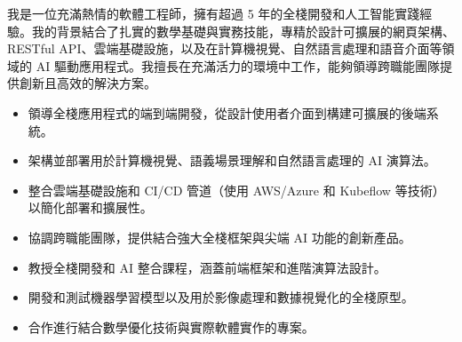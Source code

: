 \documentclass[10pt,a4paper]{altacv}
\begin{document}
\begin{CJK*}{UTF8}{bsmi}


\begin{fullwidth}
\makecvheader
\end{fullwidth}

我是一位充滿熱情的軟體工程師，擁有超過 5 年的全棧開發和人工智能實踐經驗。我的背景結合了扎實的數學基礎與實務技能，專精於設計可擴展的網頁架構、RESTful API、雲端基礎設施，以及在計算機視覺、自然語言處理和語音介面等領域的 AI 驅動應用程式。我擅長在充滿活力的環境中工作，能夠領導跨職能團隊提供創新且高效的解決方案。


\begin{itemize}
\item 領導全棧應用程式的端到端開發，從設計使用者介面到構建可擴展的後端系統。
\item 架構並部署用於計算機視覺、語義場景理解和自然語言處理的 AI 演算法。
\item 整合雲端基礎設施和 CI/CD 管道（使用 AWS/Azure 和 Kubeflow 等技術）以簡化部署和擴展性。
\item 協調跨職能團隊，提供結合強大全棧框架與尖端 AI 功能的創新產品。
\end{itemize}

\divider

\begin{itemize}
\item 教授全棧開發和 AI 整合課程，涵蓋前端框架和進階演算法設計。
\end{itemize}

\divider

\begin{itemize}
\item 開發和測試機器學習模型以及用於影像處理和數據視覺化的全棧原型。
\item 合作進行結合數學優化技術與實際軟體實作的專案。
\end{itemize}



\end{CJK*}
\end{document}
